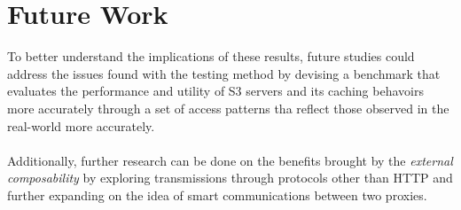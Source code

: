 \chapter{Future Work}

To better understand the implications of these results, future studies could address the issues found with the testing method by devising a benchmark that evaluates the performance and utility of S3 servers and its caching behavoirs more accurately through a set of access patterns tha reflect those observed in the real-world more accurately. 
\\\\
Additionally, further research can be done on the benefits brought by the \textit{external composability} by exploring transmissions through protocols other than HTTP and further expanding on the idea of smart communications between two proxies.